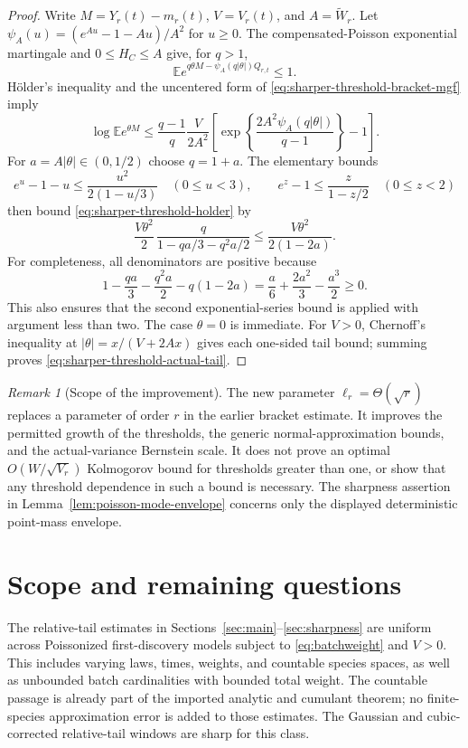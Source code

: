 \documentclass[11pt]{article}
\numberwithin{equation}{section}
\theoremstyle{remark}
\newtheorem{remark}[theorem]{Remark}
\begin{document}
\begin{proof}
Write $M=Y_r(t)-m_r(t)$, $V=V_r(t)$, and $A=\widetilde W_r$.
Let $\psi_A(u)=(e^{Au}-1-Au)/A^2$ for $u\ge0$.
The compensated-Poisson exponential martingale and $0\le H_C\le A$
give, for $q>1$,
\[
 \mathbb E e^{q\theta M-\psi_A(q|\theta|)Q_{r,t}}\le1.
\]
H\"older's inequality and the uncentered form of
\eqref{eq:sharper-threshold-bracket-mgf} imply
\begin{equation}\label{eq:sharper-threshold-holder}
 \log\mathbb E e^{\theta M}
 \le\frac{q-1}{q}\frac{V}{2A^2}
 \left[\exp\!\left\{\frac{2A^2\psi_A(q|\theta|)}{q-1}\right\}-1\right].
\end{equation}
For $a=A|\theta|\in(0,1/2)$ choose $q=1+a$.
The elementary bounds
\[
 e^u-1-u\le\frac{u^2}{2(1-u/3)}\quad(0\le u<3),\qquad
 e^z-1\le\frac{z}{1-z/2}\quad(0\le z<2)
\]
then bound \eqref{eq:sharper-threshold-holder} by
\[
 \frac{V\theta^2}{2}\,
 \frac{q}{1-qa/3-q^2a/2}
 \le\frac{V\theta^2}{2(1-2a)}.
\]
For completeness, all denominators are positive because
\[
 1-\frac{qa}{3}-\frac{q^2a}{2}-q(1-2a)
 =\frac a6+\frac{2a^2}{3}-\frac{a^3}{2}\ge0.
\]
This also ensures that the second exponential-series bound is applied
with argument less than two. The case $\theta=0$ is immediate.
For $V>0$, Chernoff's inequality at
$|\theta|=x/(V+2Ax)$ gives each one-sided tail bound; summing proves
\eqref{eq:sharper-threshold-actual-tail}.
\end{proof}

\begin{remark}[Scope of the improvement]
The new parameter $\ell_r=\Theta(\sqrt r)$ replaces a parameter of order
$r$ in the earlier bracket estimate. It improves the permitted growth
of the thresholds, the generic normal-approximation bounds, and the
actual-variance Bernstein scale. It does not prove an optimal
$O(W/\sqrt{V_r})$ Kolmogorov bound for thresholds greater than one,
or show that any threshold dependence in such a bound is necessary.
The sharpness assertion in Lemma~\ref{lem:poisson-mode-envelope} concerns
only the displayed deterministic point-mass envelope.
\end{remark}

\section{Scope and remaining questions}\label{sec:scope}

The relative-tail estimates in Sections~\ref{sec:main}--\ref{sec:sharpness}
are uniform across Poissonized first-discovery models subject to
\eqref{eq:batchweight} and $V>0$. This includes varying laws, times, weights,
and countable species spaces, as well as unbounded batch cardinalities
with bounded total weight. The countable passage is already part of the
imported analytic and cumulant theorem; no finite-species approximation
error is added to those estimates. The Gaussian and cubic-corrected
relative-tail windows are sharp for this class.
\end{document}
